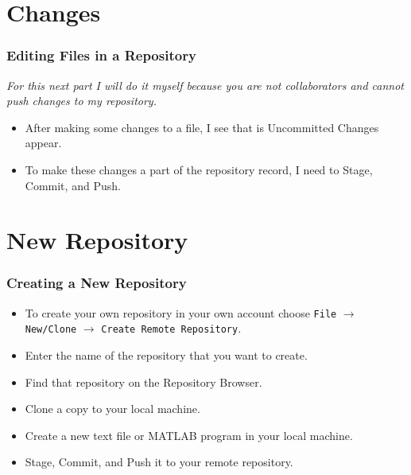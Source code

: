 \documentclass[12pt, compress,xcolor={usenames,dvipsnames}]{beamer} %
\newcommand{\Matlab}{MATLAB\xspace}
\begin{document}
\section{Changes}

\begin{frame}\frametitle{Editing Files in a  Repository}
	
	\emph{For this next part I will do it myself because you are not collaborators and cannot push changes to my repository.}
	
	\begin{itemize}
		
		\item After making some changes to a file, I see that is \alert{Uncommitted Changes} appear.
		
		\item To make these changes a part of the repository record, I need to \alert{Stage}, \alert{Commit}, and \alert{Push}.
		
	\end{itemize}
	
	
\end{frame}

\section{New Repository}

\begin{frame}\frametitle{Creating a New Repository}
		
	\begin{itemize}
		
		\item To create your own repository in your own account choose  \texttt{File} $\rightarrow$ \texttt{New/Clone} $\rightarrow$ \texttt{Create Remote Repository}.
		
		\item Enter the name of the repository that you want to create.
		
		\item Find that repository on the Repository Browser.
		
		\item Clone a copy to your local machine.
		
		\item Create a new text file or \Matlab program in your local machine.
		
		\item \alert{Stage}, \alert{Commit}, and \alert{Push} it to your remote repository.
		
	\end{itemize}
	
\end{frame}
\end{document}
